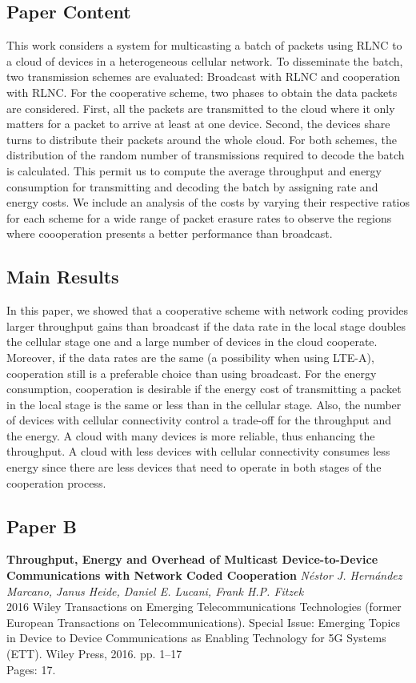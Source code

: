 \subsection*{Paper Content}
This work considers a system for multicasting a batch of packets using \ac{RLNC} to a cloud of devices in a heterogeneous cellular network. To disseminate the batch, two transmission schemes are evaluated: Broadcast with \ac{RLNC} and cooperation with \ac{RLNC}. For the cooperative scheme, two phases to obtain the data packets are considered. First, all the packets are transmitted to the cloud where it only matters for a packet to arrive at least at one device. Second, the devices share turns to distribute their packets around the whole cloud. For both schemes, the distribution of the random number of transmissions required to decode the batch is calculated. This permit us to compute the average throughput and energy consumption for transmitting and decoding the batch by assigning rate and energy costs. We include an analysis of the costs by varying their respective ratios for each scheme for a wide range of packet erasure rates to observe the regions where coooperation presents a better performance than broadcast.

\subsection*{Main Results}
In this paper, we showed that a cooperative scheme with network coding provides larger throughput gains than broadcast if the data rate in the local stage doubles the cellular stage one and a large number of devices in the cloud cooperate. Moreover, if the data rates are the same (a possibility when using \ac{LTE-A}), cooperation still is a preferable choice than using broadcast. For the energy consumption, cooperation is desirable if the energy cost of transmitting a packet in the local stage is the same or less than in the cellular stage. Also, the number of devices with cellular connectivity control a trade-off for the throughput and the energy. A cloud with many devices is more reliable, thus enhancing the throughput. A cloud with less devices with cellular connectivity consumes less energy since there are less devices that need to operate in both stages of the cooperation process.

\clearpage

\subsection{Paper B}
\textbf{Throughput, Energy and Overhead of Multicast Device-to-Device Communications with Network Coded Cooperation}
\textit{N\'estor J. Hern\'andez Marcano, Janus Heide, Daniel E. Lucani, Frank H.P. Fitzek}
\\  2016 Wiley Transactions on Emerging Telecommunications Technologies (former
European Transactions on Telecommunications). Special Issue: Emerging Topics in
Device to Device Communications as Enabling Technology for 5G Systems (ETT). Wiley Press, 2016. pp. 1--17
\\ Pages: 17.


